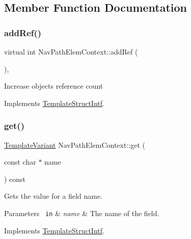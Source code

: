 \subsection{Member Function Documentation}
\mbox{\label{class_nav_path_elem_context_acb59dcbc239ee16b89c24a85ef2c5bce}} 
\subsubsection{\texorpdfstring{addRef()}{addRef()}}
{\footnotesize\ttfamily virtual int Nav\+Path\+Elem\+Context\+::add\+Ref (\begin{DoxyParamCaption}{ }\end{DoxyParamCaption})\hspace{0.3cm}{\ttfamily [inline]}, {\ttfamily [virtual]}}

Increase object\textquotesingle{}s reference count 

Implements \mbox{\hyperlink{class_template_struct_intf_a05fe97ad47633beb326f69686faed581}{Template\+Struct\+Intf}}.

\mbox{\label{class_nav_path_elem_context_a3f3e6b9d82f65a3ba6c5ac92fe315f2a}} 
\subsubsection{\texorpdfstring{get()}{get()}}
{\footnotesize\ttfamily \mbox{\hyperlink{class_template_variant}{Template\+Variant}} Nav\+Path\+Elem\+Context\+::get (\begin{DoxyParamCaption}\item[{const char $\ast$}]{name }\end{DoxyParamCaption}) const\hspace{0.3cm}{\ttfamily [virtual]}}

Gets the value for a field name. 
\begin{DoxyParams}[1]{Parameters}
\mbox{\texttt{ in}}  & {\em name} & The name of the field. \\
\hline
\end{DoxyParams}


Implements \mbox{\hyperlink{class_template_struct_intf_a3d610cb81b4adbb531ebed3aa3d09b51}{Template\+Struct\+Intf}}.

